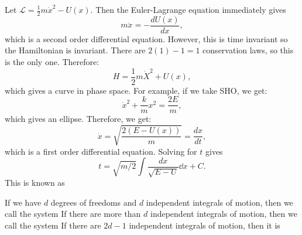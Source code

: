 \documentclass{article}
\numberwithin{equation}{section}
\begin{document}
\begin{example}
    Let $\mathcal{L} = \frac{1}{2}m\dot{x}^2 - U(x).$ Then the Euler-Lagrange equation immediately gives
    \begin{equation*}
        m\ddot{x} = -\frac{dU(x)}{dx},
    \end{equation*}
    which is a second order differential equation. However, this is time invariant so the Hamiltonian is invariant. There are $2(1)-1=1$ conservation laws, so this is the only one. Therefore:
    \begin{equation*}
        H = \frac{1}{2}m\dot{X}^2 + U(x),
    \end{equation*}
    which gives a curve in phase space. For example, if we take SHO, we get:
    \begin{equation*}
        \dot{x}^2 + \frac{k}{m}x^2 = \frac{2E}{m},
    \end{equation*}
    which gives an ellipse. Therefore, we get:
    \begin{equation*}
        \dot{x} = \sqrt{\frac{2(E-U(x))}{m}} = \frac{dx}{dt},
    \end{equation*}
    which is a first order differential equation. Solving for $t$ gives 
    \begin{equation*}
        t = \sqrt{m/2}\int \frac{dx}{\sqrt{E-U}}\dd{x} + C.
    \end{equation*}
    This is known as 
\end{example}
If we have $d$ degrees of freedoms and $d$ independent integrals of motion, then we call the system  If there are more than $d$ independent integrals of motion, then we call the system  If there are $2d-1$ independent integrals of motion, then it is 
\end{document}
